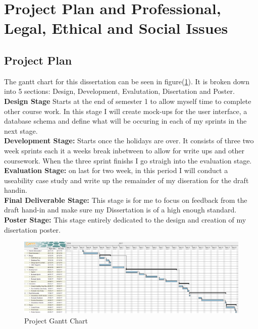 \documentclass[12pt]{article}  %
\theoremstyle{definition}
\theoremstyle{remark}
\begin{document}
\newpage
\section{Project Plan and Professional, Legal, Ethical and Social Issues}

\subsection{Project Plan}

The gantt chart for this dissertation can be seen in figure(\ref{fig:ganttchart}). It is broken down into 5 sections: Design, Development, Evalutation, Disertation and Poster.\\
\textbf{Design Stage} Starts at the end of semester 1 to allow myself time to complete other course work. In this stage I will create mock-ups for the user interface, a database schema and define what will be occuring in each of my sprints in the next stage.\\
\textbf{Development Stage:} Starts once the holidays are over. It consists of three two week sprints each it a weeks break inbetween to allow for write ups and other coursework. When the three sprint finishs I go straigh into the evaluation stage.\\ 
\textbf{Evaluation Stage: } on last for two week, in this period I will conduct a useability case study and write up the remainder of my diseration for the draft handin.\\
\textbf{Final Deliverable Stage:} This stage is for me to focus on feedback from the draft hand-in and make sure my Dissertation is of a high enough standard.\\
\textbf{Poster Stage:} This stage entirely dedicated to the design and creation of my disertation poster.

\begin{figure}[!htbp]

\includegraphics[width=\textwidth]{images/ganttchart.png}
\caption{Project Gantt Chart}
\label{fig:ganttchart}

\end{figure}
\end{document}
